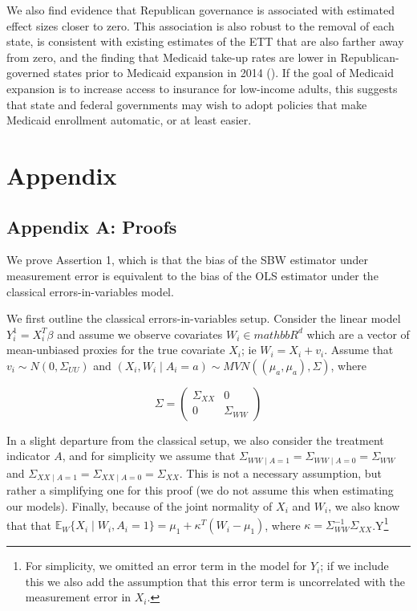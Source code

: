\documentclass[12pt]{article}
\begin{document}
We also find evidence that Republican governance is associated with estimated effect sizes closer to zero. This association is also robust to the removal of each state, is consistent with existing estimates of the ETT that are also farther away from zero, and the finding that Medicaid take-up rates are lower in Republican-governed states prior to Medicaid expansion in 2014 (\cite{sommers2012understanding}). If the goal of Medicaid expansion is to increase access to insurance for low-income adults, this suggests that state and federal governments may wish to adopt policies that make Medicaid enrollment automatic, or at least easier.

\cleardoublepage
 

\cleardoublepage

\section{Appendix}

\subsection{Appendix A: Proofs}

We prove Assertion 1, which is that the bias of the SBW estimator under measurement error is equivalent to the bias of the OLS estimator under the classical errors-in-variables model. 

We first outline the classical errors-in-variables setup. Consider the linear model $Y_i^1 = X_i^T\beta$ and assume we observe covariates $W_i \in mathbb{R}^d$ which are a vector of mean-unbiased proxies for the true covariate $X_i$; ie $W_i = X_i + v_i$. Assume that $v_i \sim N(0, \Sigma_{UU})$ and $(X_i, W_i \mid A_i = a) \sim MVN((\mu_{a}, \mu_{a}), \Sigma)$, where 

$$
\Sigma = \begin{pmatrix} 
\Sigma_{XX} & 0 \\ 
0 & \Sigma_{WW} 
\end{pmatrix}
$$ 

In a slight departure from the classical setup, we also consider the treatment indicator $A$, and for simplicity we assume that $\Sigma_{WW \mid A = 1} = \Sigma_{WW \mid A = 0} = \Sigma_{WW}$ and $\Sigma_{XX \mid A = 1} = \Sigma_{XX \mid A = 0} = \Sigma_{XX}$. This is not a necessary assumption, but rather a simplifying one for this proof (we do not assume this when estimating our models). Finally, because of the joint normality of $X_i$ and $W_i$, we also know that that $\mathbb{E}_W\{X_i \mid W_i, A_i = 1\} = \mu_1 + \kappa^T(W_i - \mu_1)$, where $\kappa = \Sigma_{WW}^{-1}\Sigma_{XX}$.Y\footnote{For simplicity, we omitted an error term in the model for $Y_i$; if we include this we also add the assumption that this error term is uncorrelated with the measurement error in $X_i$.} 
\end{document}
